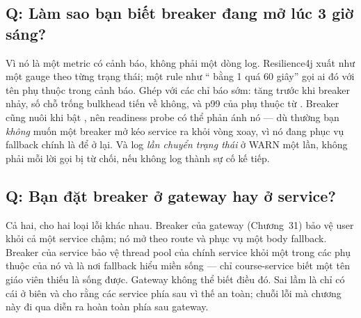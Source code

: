 \subsection*{Q: Làm sao bạn biết breaker đang mở lúc 3 giờ sáng?}

Vì nó là một metric có cảnh báo, không phải một dòng log. Resilience4j
xuất  như một gauge theo từng
trạng thái; một rule như `` bằng 1 quá 60 giây''
gọi ai đó với tên phụ thuộc trong cảnh báo. Ghép với các chỉ báo sớm:
 tăng trước khi breaker nhảy, số chỗ trống
bulkhead tiến về không, và p99 của phụ thuộc từ
. Breaker cũng nuôi
 khi bật , nên
readiness probe có thể phản ánh nó --- dù thường bạn \emph{không} muốn
một breaker mở kéo service ra khỏi vòng xoay, vì nó đang phục vụ
fallback chính là để ở lại. Và log \emph{lần chuyển trạng thái} ở WARN
một lần, không phải mỗi lời gọi bị từ chối, nếu không log thành sự cố
kế tiếp.

\subsection*{Q: Bạn đặt breaker ở gateway hay ở service?}

Cả hai, cho hai loại lỗi khác nhau. Breaker của gateway (Chương~31)
bảo vệ user khỏi cả một service chậm; nó mở theo route và phục vụ một
body fallback. Breaker của service bảo vệ thread pool của chính service
khỏi một trong các phụ thuộc của nó và là nơi fallback hiểu miền sống
--- chỉ course-service biết một tên giáo viên thiếu là sống được.
Gateway không thể biết điều đó. Sai lầm là chỉ có cái ở biên và cho
rằng các service phía sau vì thế an toàn; chuỗi lỗi mà chương này đi
qua diễn ra hoàn toàn phía sau gateway.

